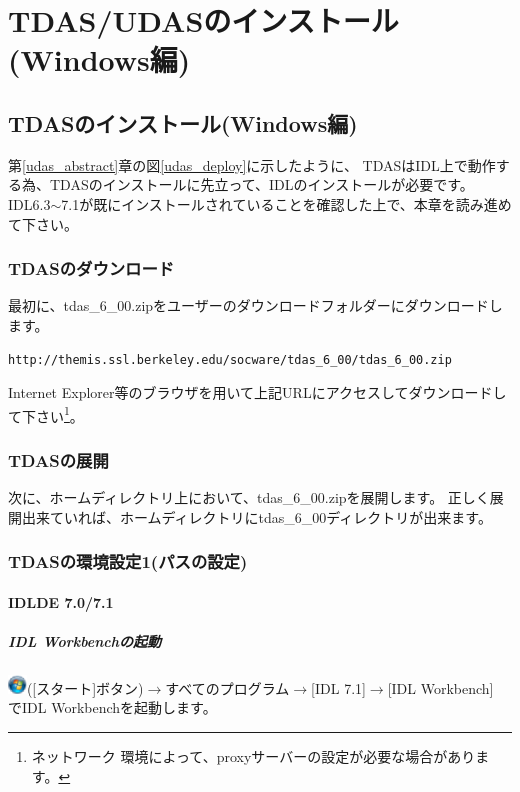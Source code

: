 \documentclass[a4j]{jbook}
\begin{document}
\part{TDAS/UDASのインストール(Windows編)}
\chapter{TDASのインストール(Windows編)}
\label{tdas_install_windows}
第\ref{udas_abstract}章の図\ref{udas_deploy}に示したように、
TDASはIDL上で動作する為、TDASのインストールに先立って、IDLのインストールが必要です。
IDL6.3$\sim$7.1が既にインストールされていることを確認した上で、本章を読み進めて下さい。

\section{TDASのダウンロード}
最初に、tdas\_6\_00.zipをユーザーのダウンロードフォルダーにダウンロードします。
\begin{screen}
\begin{verbatim}
http://themis.ssl.berkeley.edu/socware/tdas_6_00/tdas_6_00.zip
\end{verbatim}
\end{screen}
Internet Explorer等のブラウザを用いて上記URLにアクセスしてダウンロードして下さい\footnote{ネットワーク
環境によって、proxyサーバーの設定が必要な場合があります。}。

\section{TDASの展開}
次に、ホームディレクトリ上において、tdas\_6\_00.zipを展開します。
正しく展開出来ていれば、ホームディレクトリにtdas\_6\_00ディレクトリが出来ます。

\section{TDASの環境設定1(パスの設定)}

\subsection{IDLDE 7.0/7.1}

\subsubsection{IDL Workbenchの起動}
\includegraphics[width=0.5cm]{images/windows_start_button.eps}([スタート]ボタン)$\rightarrow$すべてのプログラム$\rightarrow$[IDL 7.1]$\rightarrow$[IDL Workbench]\\
でIDL Workbenchを起動します。
\end{document}

